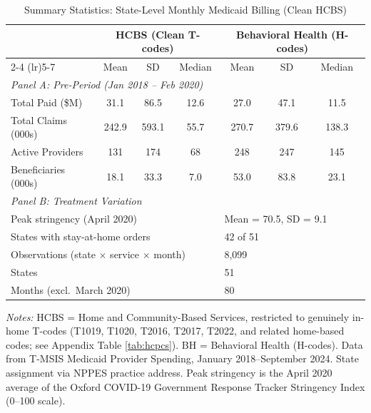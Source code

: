 \begin{table}[htbp]
\centering
\caption{Summary Statistics: State-Level Monthly Medicaid Billing (Clean HCBS)}
\label{tab:sumstats}
\small
\begin{tabular}{lcccccc}
\hline\hline
 & \multicolumn{3}{c}{HCBS (Clean T-codes)} & \multicolumn{3}{c}{Behavioral Health (H-codes)} \\
\cmidrule(lr){2-4} \cmidrule(lr){5-7}
 & Mean & SD & Median & Mean & SD & Median \\
\hline
\multicolumn{7}{l}{\textit{Panel A: Pre-Period (Jan 2018 -- Feb 2020)}} \\[3pt]
Total Paid (\$M) & 31.1 & 86.5 & 12.6 & 27.0 & 47.1 & 11.5 \\
Total Claims (000s) & 242.9 & 593.1 & 55.7 & 270.7 & 379.6 & 138.3 \\
Active Providers & 131 & 174 & 68 & 248 & 247 & 145 \\
Beneficiaries (000s) & 18.1 & 33.3 & 7.0 & 53.0 & 83.8 & 23.1 \\
[6pt]
\multicolumn{7}{l}{\textit{Panel B: Treatment Variation}} \\[3pt]
\multicolumn{4}{l}{Peak stringency (April 2020)} & \multicolumn{3}{l}{Mean = 70.5, SD = 9.1} \\
\multicolumn{4}{l}{States with stay-at-home orders} & \multicolumn{3}{l}{42 of 51} \\
\multicolumn{4}{l}{Observations (state $\times$ service $\times$ month)} & \multicolumn{3}{l}{8,099} \\
\multicolumn{4}{l}{States} & \multicolumn{3}{l}{51} \\
\multicolumn{4}{l}{Months (excl.~March 2020)} & \multicolumn{3}{l}{80} \\
\hline\hline
\end{tabular}
\begin{minipage}{0.95\textwidth}
\vspace{4pt}
\footnotesize
\textit{Notes:} HCBS = Home and Community-Based Services, restricted to genuinely in-home T-codes (T1019, T1020, T2016, T2017, T2022, and related home-based codes; see Appendix Table \ref{tab:hcpcs}). BH = Behavioral Health (H-codes). Data from T-MSIS Medicaid Provider Spending, January 2018--September 2024. State assignment via NPPES practice address. Peak stringency is the April 2020 average of the Oxford COVID-19 Government Response Tracker Stringency Index (0--100 scale).
\end{minipage}
\end{table}
